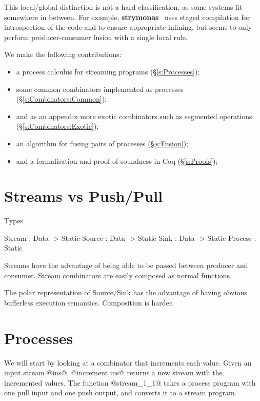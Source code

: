 This local/global distinction is not a hard classification, as some systems fit somewhere in between.
For example, {\bf strymonas}~\cite{kiselyov2016stream} uses staged compilation for introspection of the code and to ensure appropriate inlining, but seems to only perform producer-consumer fusion with a single local rule.




We make the following contributions:
\begin{itemize}
\item a process calculus for streaming programs (\S\ref{s:Processes});
\item some common combinators implemented as processes (\S\ref{s:Combinators:Common});
\item and as an appendix more exotic combinators such as segmented operations (\S\ref{s:Combinators:Exotic});
\item an algorithm for fusing pairs of processes (\S\ref{s:Fusion});
\item and a formalisation and proof of soundness in Coq (\S\ref{s:Proofs});
\end{itemize}



\section{Streams vs Push/Pull}

Types
\begin{code}
Stream  : Data -> Static
Source  : Data -> Static
Sink    : Data -> Static
Process :         Static
\end{code}

Streams have the advantage of being able to be passed between producer and consumer.
Stream combinators are easily composed as normal functions.

The polar representation of Source/Sink has the advantage of having obvious bufferless execution semantics.
Composition is harder.



\section{Processes}
\label{s:ProcessZZZ}

We will start by looking at a combinator that increments each value.
Given an input stream @ins@, @increment ins@ returns a new stream with the incremented values.
The function @stream_1_1@ takes a process program with one pull input and one push output, and converts it to a stream program.

